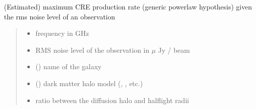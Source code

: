 \documentclass[letterpaper,10pt,english]{sphinxmanual}
\begin{document}
\begin{fulllineitems}
\label{\detokenize{diffsph:diffsph.limits.generic_rate_limest}}
\pysigstartsignatures
{}
\pysigstopsignatures
\sphinxAtStartPar
(Estimated) maximum CRE production rate (generic power\sphinxhyphen{}law hypothesis) given the rms noise level of an observation
\begin{quote}\begin{description}
\begin{itemize}
\item {} 
\sphinxAtStartPar
{} \textendash{} frequency in GHz

\item {} 
\sphinxAtStartPar
{} \textendash{} RMS noise level of the observation in \(\mu\) Jy / beam

\item {} 
\sphinxAtStartPar
{} () \textendash{} name of the galaxy

\item {} 
\sphinxAtStartPar
{} () \textendash{} dark matter halo model (, , etc.)

\item {} 
\sphinxAtStartPar
{} \textendash{} ratio between the diffusion halo and half\sphinxhyphen{}light radii


\end{itemize}
\end{description}
\end{quote}
\end{fulllineitems}
\end{document}
